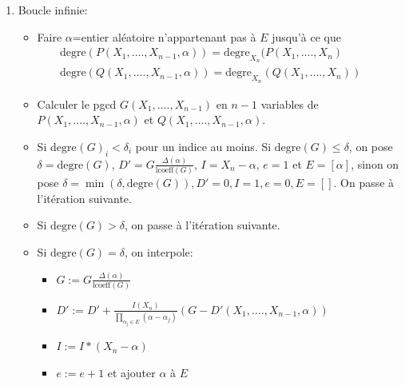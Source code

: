 \documentclass[a4paper,11pt]{book}
\begin{document}
\begin{giacjshere}
\begin{enumerate}
  \item Boucle infinie:
  \begin{itemize}
    \item Faire $\alpha$=entier aléatoire n'appartenant pas à $E$ jusqu'à ce
    que
    \begin{eqnarray*}
      \mbox{degre}(P ( X_1, \ldots ., X_{n - 1}, \alpha
      ))=\mbox{degre}_{X_n} ( P ( X_1, \ldots ., X_n ) &  & \\
      \mbox{degre} ( Q ( X_1, \ldots ., X_{n - 1}, \alpha )) =
      \mbox{degre}_{X_n} ( Q ( X_1, \ldots ., X_n )) &  & 
    \end{eqnarray*}
    \item Calculer le pgcd $G ( X_1, \ldots ., X_{n - 1} )$ en $n - 1$
    variables de $P ( X_1, \ldots ., X_{n - 1}, \alpha )$ et $Q ( X_1, \ldots
    ., X_{n - 1}, \alpha )$.
    
    \item Si $\mbox{degre}_{} ( G )_i < \delta_i$ pour un indice au moins.
    Si $\mbox{degre} ( G ) \leq \delta$, on pose $\delta =
    \mbox{degre} ( G )$, $D' = G \frac{\Delta ( \alpha )}{\mbox{lcoeff} ( G
    )}$, $I = X_n - \alpha$, $e = 1$ et $E = [ \alpha ]$, sinon on pose $\delta
    = \min ( \delta, \mbox{degre} ( G )), D' = 0, I = 1, e = 0, E = [ ]$.
    On passe à l'itération suivante.

    \item Si $\mbox{degre} ( G ) > \delta$, on passe à l'itération suivante.
    
    \item Si $\mbox{degre} ( G ) = \delta$, on interpole:
    \begin{itemize}
      \item $G := G \frac{\Delta ( \alpha )}{\mbox{lcoeff} ( G )}$
      
      \item $D' := D' + \frac{I ( X_n )}{\prod_{\alpha_j \in E} ( \alpha -
      \alpha_j )} ( G - D' ( X_1, \ldots ., X_{n - 1}, \alpha ))$
      
      \item $I := I \ast ( X_n - \alpha )$
      
      \item $e := e + 1$ et ajouter $\alpha$ à $E$
      

\end{itemize}
\end{itemize}
\end{enumerate}
\end{giacjshere}
\end{document}

